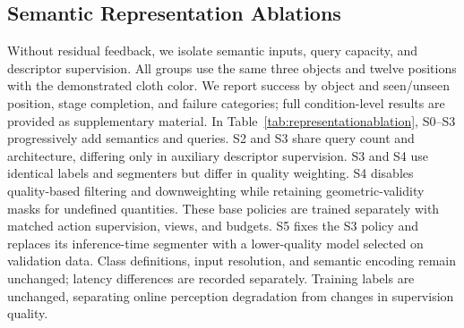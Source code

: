 \subsection{Semantic Representation Ablations}
\label{sec:representationexperiments}
Without residual feedback, we isolate semantic inputs, query capacity, and descriptor supervision.
All groups use the same three objects and twelve positions with the demonstrated cloth color.
We report success by object and seen/unseen position, stage completion, and failure categories; full condition-level results are provided as supplementary material.
In Table~\ref{tab:representationablation}, S0--S3 progressively add semantics and queries.
S2 and S3 share query count and architecture, differing only in auxiliary descriptor supervision.
S3 and S4 use identical labels and segmenters but differ in quality weighting.
S4 disables quality-based filtering and downweighting while retaining geometric-validity masks for undefined quantities.
These base policies are trained separately with matched action supervision, views, and budgets.
S5 fixes the S3 policy and replaces its inference-time segmenter with a lower-quality model selected on validation data.
Class definitions, input resolution, and semantic encoding remain unchanged; latency differences are recorded separately.
Training labels are unchanged, separating online perception degradation from changes in supervision quality.

